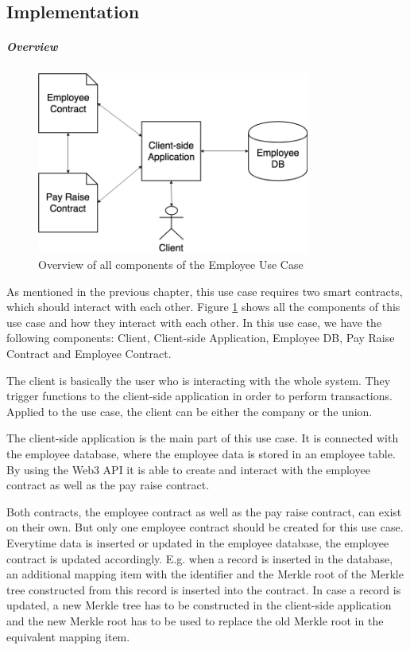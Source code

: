 \subsection{Implementation}
\subparagraph{Overview}

\begin{figure}[h]%
	\centering
	\includegraphics[width=0.8\textwidth]{images/payraiseusecase.png}
	\caption{\label{fig:payraiseusecase}Overview of all components of the Employee Use Case}
\end{figure}

As mentioned in the previous chapter, this use case requires two smart contracts, which should interact with each other. Figure \ref{fig:payraiseusecase} shows all the components of this use case and how they interact with each other. In this use case, we have the following components: Client, Client-side Application, Employee DB, Pay Raise Contract and Employee Contract.

The client is basically the user who is interacting with the whole system. They trigger functions to the client-side application in order to perform transactions. Applied to the use case, the client can be either the company or the union.

The client-side application is the main part of this use case. It is connected with the employee database, where the employee data is stored in an employee table. By using the Web3 API it is able to create and interact with the employee contract as well as the pay raise contract.

Both contracts, the employee contract as well as the pay raise contract, can exist on their own. But only one employee contract should be created for this use case. Everytime data is inserted or updated in the employee database, the employee contract is updated accordingly. E.g. when a record is inserted in the database, an additional mapping item with the identifier and the Merkle root of the Merkle tree constructed from this record is inserted into the contract. In case a record is updated, a new Merkle tree has to be constructed in the client-side application and the new Merkle root has to be used to replace the old Merkle root in the equivalent mapping item.

